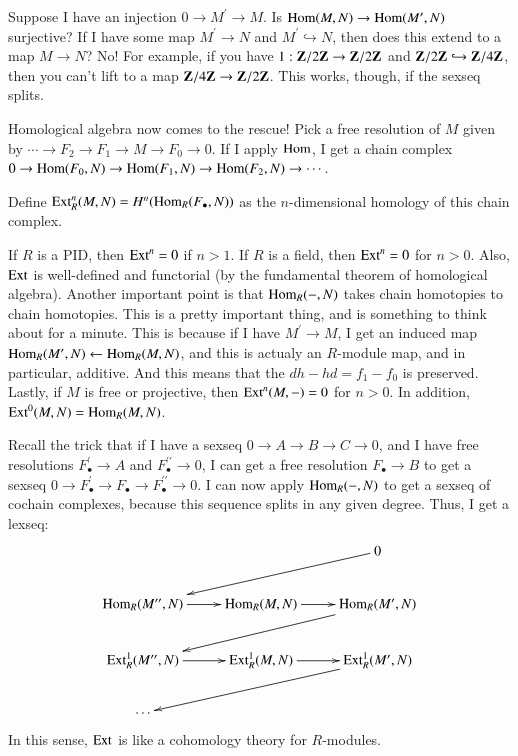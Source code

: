 Suppose I have an injection $0\to M^\prime\to M$. Is $\operatorname{Hom}(M,N)\to\operatorname{Hom}(M^\prime,N)$ surjective? If I have some map $M^\prime\to N$ and $M^\prime\hookrightarrow N$, then does this extend to a map $M\to N$? No! For example, if you have $1:\mathbf Z/2\mathbf Z\to\mathbf Z/2\mathbf Z$ and $\mathbf Z/2\mathbf Z\hookrightarrow\mathbf Z/4\mathbf Z$, then you can't lift to a map $\mathbf Z/4\mathbf Z\to\mathbf Z/2\mathbf Z$. This works, though, if the sexseq splits.

Homological algebra now comes to the rescue! Pick a free resolution of $M$ given by $\cdots\to F_2\to F_1\to M\to F_0\to 0$. If I apply $\operatorname{Hom}$, I get a chain complex $0\to \operatorname{Hom}(F_0,N)\to \operatorname{Hom}(F_1,N)\to \operatorname{Hom}(F_2,N)\to\cdots$.
\begin{definition}
Define $\operatorname{Ext}_R^n(M,N)= H^n(\operatorname{Hom}_R(F_\bullet,N))$ as the $n$-dimensional homology of this chain complex.
\end{definition}
\begin{remark}
If $R$ is a PID, then $\operatorname{Ext}^n=0$ if $n>1$. If $R$ is a field, then $\operatorname{Ext}^n=0$ for $n>0$. Also, $\operatorname{Ext}$ is well-defined and functorial (by the fundamental theorem of homological algebra). Another important point is that $\operatorname{Hom}_R(-,N)$ takes chain homotopies to chain homotopies. This is a pretty important thing, and is something to think about for a minute. This is because if I have $M^\prime\to M$, I get an induced map $\operatorname{Hom}_R(M^\prime,N)\leftarrow\operatorname{Hom}_R(M,N)$, and this is actualy an $R$-module map, and in particular, additive. And this means that the $dh-hd=f_1-f_0$ is preserved. Lastly, if $M$ is free or projective, then $\operatorname{Ext}^n(M,-)=0$ for $n>0$. In addition, $\operatorname{Ext}^0(M,N)=\operatorname{Hom}_R(M,N)$.
\end{remark}
Recall the trick that if I have a sexseq $0\to A\to B\to C\to 0$, and I have free resolutions $F^\prime_\bullet\to A$ and $F^{\prime\prime}_\bullet\to 0$, I can get a free resolution $F_\bullet\to B$ to get a sexseq $0\to F^\prime_\bullet\to F_\bullet\to F^{\prime\prime}_\bullet\to 0$. I can now apply $\operatorname{Hom}_R(-,N)$ to get a sexseq of cochain complexes, because this sequence splits in any given degree. Thus, I get a lexseq:
\begin{equation*}
\xymatrix{ & & 0\ar[dll]\\
\Hom_R(M^{\prime\prime},N)\ar[r] & \Hom_R(M,N)\ar[r] & \Hom_R(M^{\prime},N)\ar[dll]\\
\Ext^1_R(M^{\prime\prime},N)\ar[r] & \Ext^1_R(M,N)\ar[r] & \Ext^1_R(M^{\prime},N)\ar[dll]\\
\cdots & &}
\end{equation*}
In this sense, $\operatorname{Ext}$ is like a cohomology theory for $R$-modules.

